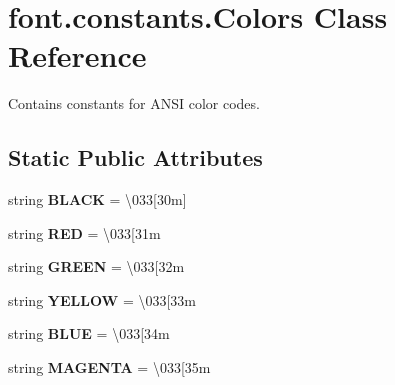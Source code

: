 \hypertarget{classfont_1_1constants_1_1Colors}{}\section{font.\+constants.\+Colors Class Reference}
\label{classfont_1_1constants_1_1Colors}


Contains constants for A\+N\+SI color codes.  


\subsection*{Static Public Attributes}
\begin{DoxyCompactItemize}
\item 
string {\bfseries B\+L\+A\+CK} = \textquotesingle{}\textbackslash{}033\mbox{[}30m\mbox{]}\textquotesingle{}\hypertarget{classfont_1_1constants_1_1Colors_afb0947d4badc4d61510141f299ae342f}{}\label{classfont_1_1constants_1_1Colors_afb0947d4badc4d61510141f299ae342f}

\item 
string {\bfseries R\+ED} = \textquotesingle{}\textbackslash{}033\mbox{[}31m\textquotesingle{}\hypertarget{classfont_1_1constants_1_1Colors_ab71c856d5c4608461c28c583dd7801b6}{}\label{classfont_1_1constants_1_1Colors_ab71c856d5c4608461c28c583dd7801b6}

\item 
string {\bfseries G\+R\+E\+EN} = \textquotesingle{}\textbackslash{}033\mbox{[}32m\textquotesingle{}\hypertarget{classfont_1_1constants_1_1Colors_a36b2a63f5603bddc4b00def85db005b6}{}\label{classfont_1_1constants_1_1Colors_a36b2a63f5603bddc4b00def85db005b6}

\item 
string {\bfseries Y\+E\+L\+L\+OW} = \textquotesingle{}\textbackslash{}033\mbox{[}33m\textquotesingle{}\hypertarget{classfont_1_1constants_1_1Colors_a7325d06cee4dc3a6097bf584d7a0c086}{}\label{classfont_1_1constants_1_1Colors_a7325d06cee4dc3a6097bf584d7a0c086}

\item 
string {\bfseries B\+L\+UE} = \textquotesingle{}\textbackslash{}033\mbox{[}34m\textquotesingle{}\hypertarget{classfont_1_1constants_1_1Colors_a46ce2e0fc3e5c40075cae590eaf85293}{}\label{classfont_1_1constants_1_1Colors_a46ce2e0fc3e5c40075cae590eaf85293}

\item 
string {\bfseries M\+A\+G\+E\+N\+TA} = \textquotesingle{}\textbackslash{}033\mbox{[}35m\textquotesingle{}\hypertarget{classfont_1_1constants_1_1Colors_a8fa42a6991d5157672c51a9b953279c6}{}\label{classfont_1_1constants_1_1Colors_a8fa42a6991d5157672c51a9b953279c6}


\end{DoxyCompactItemize}
